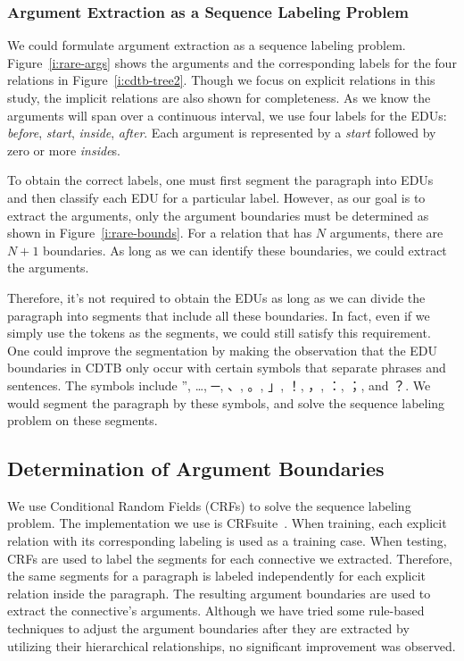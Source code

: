 \subsubsection{Argument Extraction as a Sequence Labeling Problem}

We could formulate argument extraction as a sequence labeling problem.
Figure~\ref{i:rare-args} shows the arguments and the corresponding labels
for the four relations in Figure~\ref{i:cdtb-tree2}. Though we
focus on explicit relations in this study, the implicit relations are also shown
for completeness.
As we know the arguments will span over a continuous interval,
we use four labels for the EDUs: \textit{before}, \textit{start},
\textit{inside}, \textit{after}. Each argument is represented by
a \textit{start} followed by zero or more \textit{inside}s.



To obtain the correct labels, one must first segment the paragraph
into EDUs and then classify each EDU for a particular label.
However, as our goal is to extract the arguments, only the
argument boundaries must be determined as shown in
Figure~\ref{i:rare-bounds}. For a relation that has $N$ arguments,
there are $N+1$ boundaries. As long as we can identify these boundaries,
we could extract the arguments.




Therefore, it's not required to obtain the EDUs as long as
we can divide the paragraph into segments that include all these boundaries.
In fact, even if we simply use the tokens as the segments, we could still satisfy
this requirement. One could improve the segmentation by making the observation
that the EDU boundaries in CDTB only occur with certain symbols that separate
phrases and sentences. The symbols include ”, …, ─, 、, 。, 」, ！, ，, ：, ；, and ？.
We would segment the paragraph by these symbols, and solve the sequence labeling
problem on these segments.

\subsection{Determination of Argument Boundaries}

We use Conditional Random Fields (CRFs) to solve the sequence labeling problem.
The implementation we use is CRFsuite~\citep{CRFsuite}. When training, each explicit
relation with its corresponding labeling is used as a training case. When testing,
CRFs are used to label the segments for each connective we extracted. Therefore,
the same segments for a paragraph is labeled independently for each explicit relation
inside the paragraph. The resulting argument boundaries are used to extract the connective's
arguments. Although we have tried some rule-based techniques to adjust the argument boundaries
after they are extracted by utilizing their hierarchical relationships,
no significant improvement was observed.

